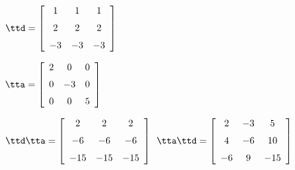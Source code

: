 {$\ttd = \left[ \begin {array}{ccc} 1&1&1\\\noalign{\medskip}2&2&2
\\\noalign{\medskip}-3&-3&-3\end {array} \right] $
 
$\tta = \left[ \begin {array}{ccc} 2&0&0\\\noalign{\medskip}0&-3&0
\\\noalign{\medskip}0&0&5\end {array} \right] $}
{$\ttd\tta= \left[ \begin {array}{ccc} 2&2&2\\\noalign{\medskip}-6&-6&-6
\\\noalign{\medskip}-15&-15&-15\end {array} \right]$\ 
$\tta\ttd =  \left[ \begin {array}{ccc} 2&-3&5\\\noalign{\medskip}4&-6&10
\\\noalign{\medskip}-6&9&-15\end {array} \right] $
}
 

  

  

 

